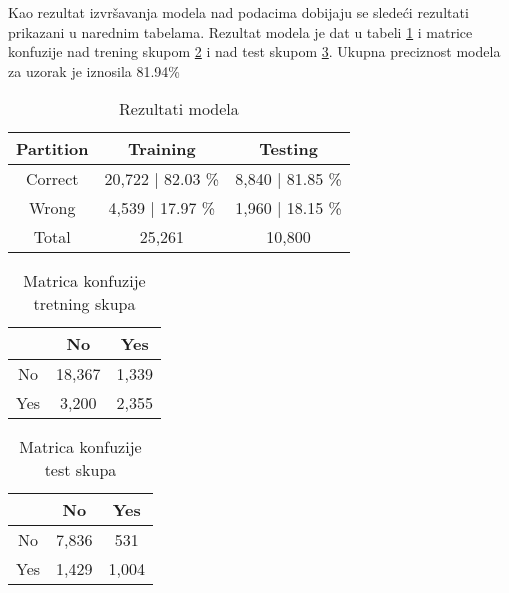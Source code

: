 \documentclass[a4paper]{article}
\begin{document}
Kao rezultat izvršavanja modela nad podacima dobijaju se sledeći rezultati prikazani u narednim tabelama. Rezultat modela je dat u tabeli \ref{tab:KNN-res} i matrice konfuzije nad trening skupom \ref{tab:KNN-training-CM} i nad test skupom \ref{tab:KNN-testing-CM}. Ukupna preciznost modela za uzorak je iznosila 81.94\%\par


\begin{table}[H]
        \begin{center}
        \caption{Rezultati modela}
        \label{tab:KNN-res}
        \begin{tabular}{|c|c|c|} \hline
        \textbf{Partition} & \textbf{Training} & \textbf{Testing}\\ \hline
        Correct & 20,722 | 82.03 \% & 8,840 | 81.85 \% \\ \hline
        Wrong    & 4,539 | 17.97 \% & 1,960 | 18.15 \% \\ \hline
        Total & 25,261  & 10,800 \\ \hline
        \end{tabular}
        \end{center}
\end{table}
\begin{table}[H]
        \begin{center}
        \caption{Matrica konfuzije tretning skupa}
        \label{tab:KNN-training-CM}
        \begin{tabular}{|c|c|c|} \hline
        \textbf{} & \textbf{No} & \textbf{Yes} \\ \hline
        No & 18,367 & 1,339  \\ \hline
        Yes & 3,200 & 2,355 \\ \hline
        \end{tabular}
        \end{center}
\end{table}

\begin{table}[H]
        \begin{center}
        \caption{Matrica konfuzije test skupa}
        \label{tab:KNN-testing-CM}
        \begin{tabular}{|c|c|c|} \hline
        \textbf{} & \textbf{No} & \textbf{Yes} \\ \hline
        No & 7,836 & 531  \\ \hline
        Yes &  1,429 & 1,004 \\ \hline
        \end{tabular}
        \end{center}
\end{table}
\end{document}
